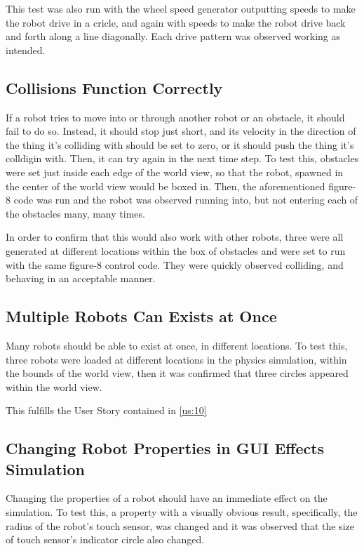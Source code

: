 This test was also run with the wheel speed generator outputting speeds to make the robot drive in a cricle, and again with speeds to make the robot drive back and forth along a line diagonally. Each drive pattern was observed working as intended.

\subsection{Collisions Function Correctly}
If a robot tries to move into or through another robot or an obstacle, it should fail to do so. Instead, it should stop just short, and its velocity in the direction of the thing it's colliding with should be set to zero, or it should push the thing it's colldigin with. Then, it can try again in the next time step. To test this, obstacles were set just inside each edge of the world view, so that the robot, spawned in the center of the world view would be boxed in. Then, the aforementioned figure-8 code was run and the robot was observed running into, but not entering each of the obstacles many, many times. 

In order to confirm that this would also work with other robots, three were all generated at different locations within the box of obstacles and were set to run with the same figure-8 control code. They were quickly observed colliding, and behaving in an acceptable manner.

\subsection{Multiple Robots Can Exists at Once}
Many robots should be able to exist at once, in different locations. To test this, three robots were loaded at different locations in the physics simulation, within the bounds of the world view, then it was confirmed that three circles appeared within the world view.

This fulfills the User Story contained in \ref{us:10}

\subsection{Changing Robot Properties in GUI Effects Simulation}
Changing the properties of a robot should have an immediate effect on the simulation. To test this, a property with a visually obvious result, specifically, the radius of the robot's touch sensor, was changed and it was observed that the size of touch sensor's indicator circle also changed.

